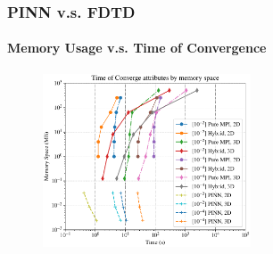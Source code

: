 \begin{frame}
  \frametitle{PINN v.s. FDTD}
  \framesubtitle{Memory Usage v.s. Time of Convergence}

  
  \begin{figure}[htbp]
    \centering
    \includegraphics[width=0.55\textwidth]{figure/FIG_Benchmark_Time_Tol.pdf}
    \label{FIG:Benchmark:TimeTol}
  \end{figure}
\end{frame}

